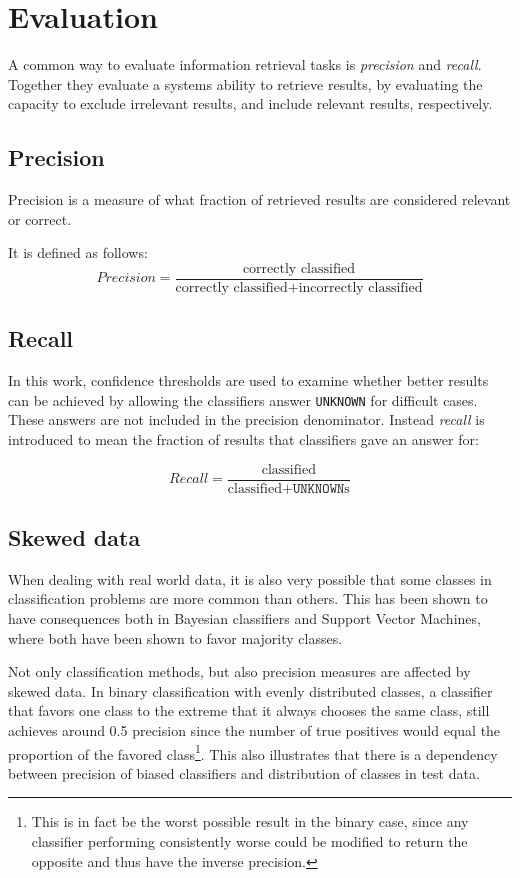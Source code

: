 \documentclass[a4paper,11pt]{kth-mag}
\begin{document}
\newpage
\section{Evaluation}
A common way to evaluate information retrieval tasks is \emph{precision} and \emph{recall}. Together they evaluate a systems ability to retrieve results, by evaluating the capacity to exclude irrelevant results, and include relevant results, respectively.

\subsection{Precision}
Precision is a measure of what fraction of retrieved results are considered relevant or correct.

It is defined as follows:
\begin{equation} \label{eq:precision}
Precision = \frac{\text {correctly classified}}{\text{correctly classified} + \text{incorrectly classified}}
\end{equation}

\subsection{Recall}
In this work, confidence thresholds are used to examine whether better results can be achieved by allowing the classifiers answer \texttt{UNKNOWN} for difficult cases. These answers are not included in the precision denominator. Instead \emph{recall} is introduced to mean the fraction of results that classifiers gave an answer for:

\begin{equation} \label{eq:recall}
Recall = \frac{\text {classified}}{\text{classified} + \texttt{UNKNOWN}\text{s}}
\end{equation}


\subsection{Skewed data}
\label{subsec:bias}
When dealing with real world data, it is also very possible that some classes in classification problems are more common than others. This has been shown to have consequences both in Bayesian classifiers\cite{rennie2003bias} and Support Vector Machines\cite{svm_bias}, where both have been shown to favor majority classes\cite{rennie2003bias, svm_bias}.

Not only classification methods, but also precision measures are affected by skewed data. In binary classification with evenly distributed classes, a classifier that favors one class to the extreme that it always chooses the same class, still achieves around 0.5 precision since the number of true positives would equal the proportion of the favored class\footnote{This is in fact be the worst possible result in the binary case, since any classifier performing consistently worse could be modified to return the opposite and thus have the inverse precision.}. This also illustrates that there is a dependency between precision of biased classifiers and distribution of classes in test data.
\end{document}
